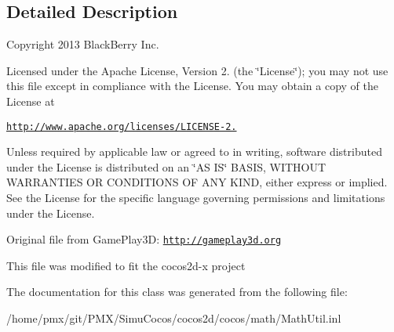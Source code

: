\subsection{Detailed Description}
Copyright 2013 Black\+Berry Inc.

Licensed under the Apache License, Version 2. (the \char`\"{}\+License\char`\"{}); you may not use this file except in compliance with the License. You may obtain a copy of the License at

\href{http://www.apache.org/licenses/LICENSE-2.0}{\tt http\+://www.\+apache.\+org/licenses/\+L\+I\+C\+E\+N\+S\+E-\/2.}

Unless required by applicable law or agreed to in writing, software distributed under the License is distributed on an \char`\"{}\+A\+S I\+S\char`\"{} B\+A\+S\+IS, W\+I\+T\+H\+O\+UT W\+A\+R\+R\+A\+N\+T\+I\+ES OR C\+O\+N\+D\+I\+T\+I\+O\+NS OF A\+NY K\+I\+ND, either express or implied. See the License for the specific language governing permissions and limitations under the License.

Original file from Game\+Play3D\+: \href{http://gameplay3d.org}{\tt http\+://gameplay3d.\+org}

This file was modified to fit the cocos2d-\/x project 

The documentation for this class was generated from the following file\+:\begin{DoxyCompactItemize}
\item 
/home/pmx/git/\+P\+M\+X/\+Simu\+Cocos/cocos2d/cocos/math/Math\+Util.\+inl\end{DoxyCompactItemize}

